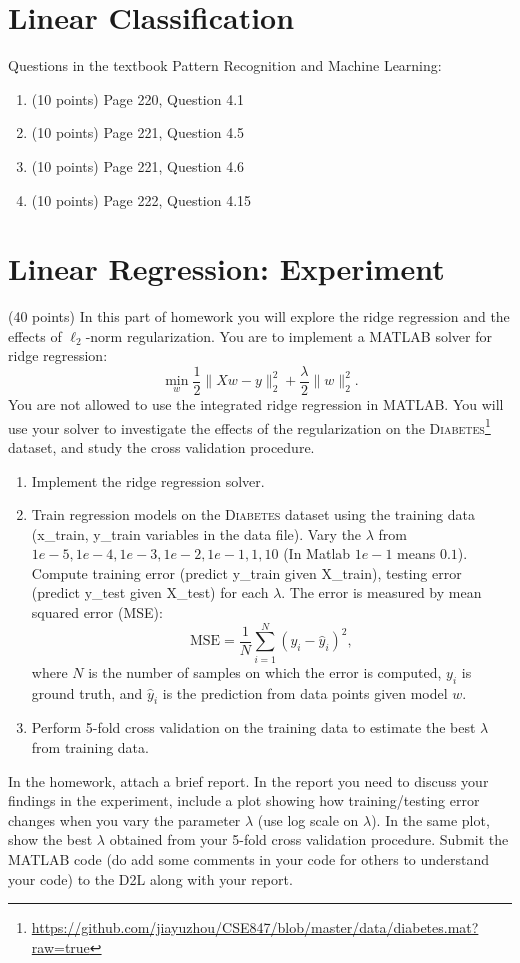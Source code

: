 \documentclass[11pt]{article}
\begin{document}
\section{Linear Classification} 

Questions in the textbook Pattern Recognition and Machine Learning:
\begin{enumerate}
\item (10 points) Page 220, Question 4.1
\item (10 points) Page 221, Question 4.5
\item (10 points) Page 221, Question 4.6
\item (10 points) Page 222, Question 4.15
\end{enumerate}

\section{Linear Regression: Experiment} 

 (40 points) In this part of homework you will explore the ridge regression and the effects of
$\ell_2$-norm regularization. You are to implement a MATLAB solver for ridge regression:
$$ \min_w \frac{1}{2}\|Xw - y\|_2^2 + \frac{\lambda}{2} \|w\|_2^2. $$
You are not allowed to use the integrated ridge regression in MATLAB.
You will use your solver to investigate the effects of the regularization on the \textsc{Diabetes}\footnote{\url{https://github.com/jiayuzhou/CSE847/blob/master/data/diabetes.mat?raw=true}}
dataset, and study the cross validation procedure.

\begin{enumerate}
\item Implement the ridge regression solver.  
\item Train regression models on the \textsc{Diabetes} dataset using 
the training data (x\_train, y\_train variables in the data file). 
Vary the $\lambda$ from ${1e-5}, {1e-4}, {1e-3}, {1e-2}, {1e-1}, 1, 10$ (In 
Matlab $1e-1$ means $0.1$). 
Compute training error (predict y\_train given X\_train), testing error (predict y\_test given X\_test) for each $\lambda$. 
The error is measured by mean squared error (MSE):
$$
\mbox{MSE} = \frac{1}{N}\sum_{i=1}^N (y_i - \hat y_i)^2,
$$
where $N$ is the number of samples on which the error is computed, $y_i$ 
is ground truth, and $\hat y_i$ is the prediction from data points 
given model $w$. 
\item Perform 5-fold cross validation on the training data to estimate the best $\lambda$ from training data.
\end{enumerate}

In the homework, attach a brief report. In the report you need to
discuss your findings in the experiment, include a plot showing how
training/testing error changes when you vary the parameter $\lambda$ (use log
scale on $\lambda$). In the same plot, show the best $\lambda$ obtained from
your 5-fold cross validation procedure. Submit the MATLAB code (do add some comments in your code for others to understand your code) to the D2L along with your report. \\
\end{document}
